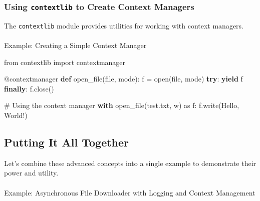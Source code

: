 \documentclass[
  letterpaper,
  DIV=11,
  numbers=noendperiod]{scrreprt}
\makeatletter
\let\oldparagraph\paragraph
\renewcommand{\paragraph}{
    \@ifstar
      \xxxParagraphStar
      \xxxParagraphNoStar
  }
\newcommand{\xxxParagraphStar}[1]{\oldparagraph*{#1}\mbox{}}
\newcommand{\xxxParagraphNoStar}[1]{\oldparagraph{#1}\mbox{}}
\newenvironment{Shaded}{\begin{snugshade}}{\end{snugshade}}
\newcommand{\AttributeTok}[1]{\textcolor[rgb]{0.40,0.45,0.13}{#1}}
\newcommand{\BuiltInTok}[1]{\textcolor[rgb]{0.00,0.23,0.31}{#1}}
\newcommand{\CommentTok}[1]{\textcolor[rgb]{0.37,0.37,0.37}{#1}}
\newcommand{\ControlFlowTok}[1]{\textcolor[rgb]{0.00,0.23,0.31}{\textbf{#1}}}
\newcommand{\ImportTok}[1]{\textcolor[rgb]{0.00,0.46,0.62}{#1}}
\newcommand{\KeywordTok}[1]{\textcolor[rgb]{0.00,0.23,0.31}{\textbf{#1}}}
\newcommand{\NormalTok}[1]{\textcolor[rgb]{0.00,0.23,0.31}{#1}}
\newcommand{\OperatorTok}[1]{\textcolor[rgb]{0.37,0.37,0.37}{#1}}
\newcommand{\StringTok}[1]{\textcolor[rgb]{0.13,0.47,0.30}{#1}}
\makeatother
\begin{document}
\subsubsection{\texorpdfstring{Using \texttt{contextlib} to Create
Context
Managers}{Using contextlib to Create Context Managers}}\label{using-contextlib-to-create-context-managers}

The \texttt{contextlib} module provides utilities for working with
context managers.

\paragraph{Example: Creating a Simple Context
Manager}\label{example-creating-a-simple-context-manager}

\begin{Shaded}
\begin{Highlighting}[]
\ImportTok{from}\NormalTok{ contextlib }\ImportTok{import}\NormalTok{ contextmanager}

\AttributeTok{@contextmanager}
\KeywordTok{def}\NormalTok{ open\_file(}\BuiltInTok{file}\NormalTok{, mode):}
\NormalTok{    f }\OperatorTok{=} \BuiltInTok{open}\NormalTok{(}\BuiltInTok{file}\NormalTok{, mode)}
    \ControlFlowTok{try}\NormalTok{:}
        \ControlFlowTok{yield}\NormalTok{ f}
    \ControlFlowTok{finally}\NormalTok{:}
\NormalTok{        f.close()}

\CommentTok{\# Using the context manager}
\ControlFlowTok{with}\NormalTok{ open\_file(}\StringTok{\textquotesingle{}test.txt\textquotesingle{}}\NormalTok{, }\StringTok{\textquotesingle{}w\textquotesingle{}}\NormalTok{) }\ImportTok{as}\NormalTok{ f:}
\NormalTok{    f.write(}\StringTok{\textquotesingle{}Hello, World!\textquotesingle{}}\NormalTok{)}
\end{Highlighting}
\end{Shaded}

\subsection{Putting It All Together}\label{putting-it-all-together}

Let's combine these advanced concepts into a single example to
demonstrate their power and utility.

\paragraph{Example: Asynchronous File Downloader with Logging and
Context
Management}\label{example-asynchronous-file-downloader-with-logging-and-context-management}
\end{document}
